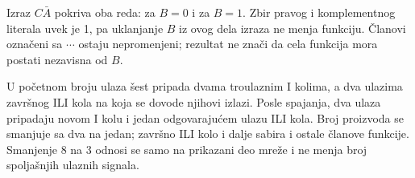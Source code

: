 Izraz \(C\bar A\) pokriva oba reda: za \(B=0\) i za \(B=1\). Zbir pravog i komplementnog literala uvek je 1, pa uklanjanje \(B\) iz ovog dela izraza ne menja funkciju. Članovi označeni sa \(\cdots\) ostaju nepromenjeni; rezultat ne znači da cela funkcija mora postati nezavisna od \(B\).

U početnom broju ulaza šest pripada dvama troulaznim I kolima, a dva ulazima završnog ILI kola na koja se dovode njihovi izlazi. Posle spajanja, dva ulaza pripadaju novom I kolu i jedan odgovarajućem ulazu ILI kola. Broj proizvoda se smanjuje sa dva na jedan; završno ILI kolo i dalje sabira i ostale članove funkcije. Smanjenje 8 na 3 odnosi se samo na prikazani deo mreže i ne menja broj spoljašnjih ulaznih signala.

